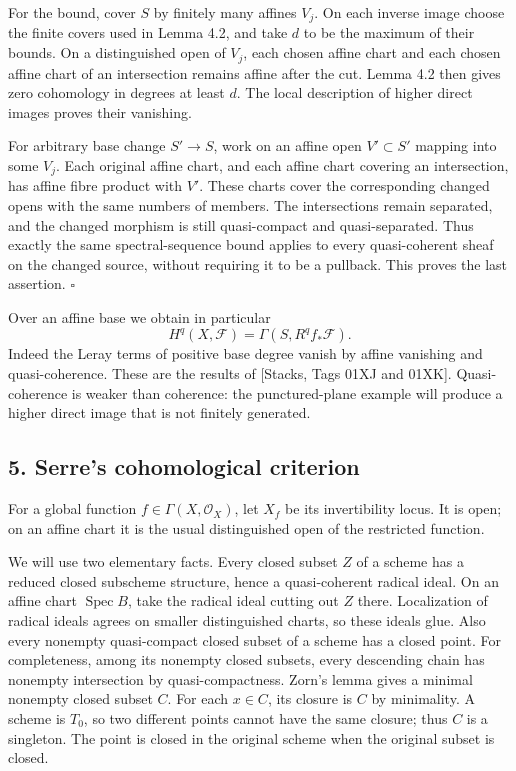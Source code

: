 \documentclass[11pt]{article}
\begin{document}
For the bound, cover \(S\) by finitely many affines \(V_j\). On each
inverse image choose the finite covers used in Lemma 4.2, and take \(d\)
to be the maximum of their bounds. On a distinguished open of \(V_j\),
each chosen affine chart and each chosen affine chart of an intersection
remains affine after the cut. Lemma 4.2 then gives zero cohomology in
degrees at least \(d\). The local description of higher direct images
proves their vanishing.

For arbitrary base change \(S'\to S\), work on an affine open
\(V'\subset S'\) mapping into some \(V_j\). Each original affine chart,
and each affine chart covering an intersection, has affine fibre product
with \(V'\). These charts cover the corresponding changed opens with the
same numbers of members. The intersections remain separated, and the
changed morphism is still quasi-compact and quasi-separated. Thus
exactly the same spectral-sequence bound applies to every quasi-coherent
sheaf on the changed source, without requiring it to be a pullback. This
proves the last assertion. \(\square\)

Over an affine base we obtain in particular \[
H^q(X,\mathcal F)=\Gamma(S,R^qf_*\mathcal F).
\] Indeed the Leray terms of positive base degree vanish by affine
vanishing and quasi-coherence. These are the results of {[}Stacks, Tags
01XJ and 01XK{]}. Quasi-coherence is weaker than coherence: the
punctured-plane example will produce a higher direct image that is not
finitely generated.

\subsection{5. Serre's cohomological
criterion}\label{serres-cohomological-criterion}

For a global function \(f\in\Gamma(X,\mathcal O_X)\), let \(X_f\) be its
invertibility locus. It is open; on an affine chart it is the usual
distinguished open of the restricted function.

We will use two elementary facts. Every closed subset \(Z\) of a scheme
has a reduced closed subscheme structure, hence a quasi-coherent radical
ideal. On an affine chart \(\operatorname{Spec}B\), take the radical
ideal cutting out \(Z\) there. Localization of radical ideals agrees on
smaller distinguished charts, so these ideals glue. Also every nonempty
quasi-compact closed subset of a scheme has a closed point. For
completeness, among its nonempty closed subsets, every descending chain
has nonempty intersection by quasi-compactness. Zorn's lemma gives a
minimal nonempty closed subset \(C\). For each \(x\in C\), its closure
is \(C\) by minimality. A scheme is \(T_0\), so two different points
cannot have the same closure; thus \(C\) is a singleton. The point is
closed in the original scheme when the original subset is closed.
\end{document}
